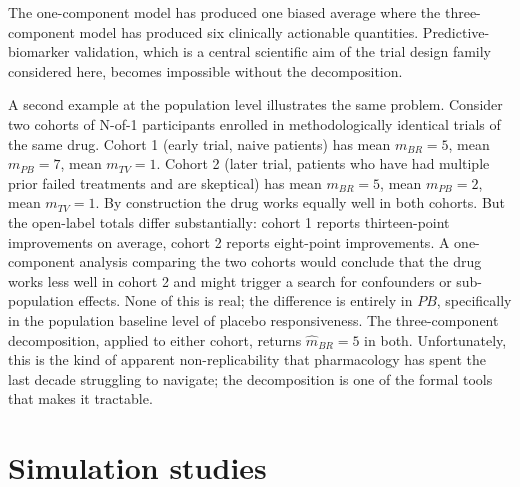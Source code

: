 \documentclass[
  11pt,
]{article}
\begin{document}
The one-component model has produced one biased average where the
three-component model has produced six clinically actionable quantities.
Predictive-biomarker validation, which is a central scientific aim of the
trial design family considered here, becomes impossible without the
decomposition.

A second example at the population level illustrates the same problem.
Consider two cohorts of N-of-1 participants enrolled in methodologically
identical trials of the same drug. Cohort 1 (early trial, naive patients) has
mean \(m_{BR} = 5\), mean \(m_{PB} = 7\), mean \(m_{TV} = 1\). Cohort 2 (later
trial, patients who have had multiple prior failed treatments and are
skeptical) has mean \(m_{BR} = 5\), mean \(m_{PB} = 2\), mean \(m_{TV} = 1\). By
construction the drug works equally well in both cohorts. But the open-label
totals differ substantially: cohort 1 reports thirteen-point improvements on
average, cohort 2 reports eight-point improvements. A one-component analysis
comparing the two cohorts would conclude that the drug works less well in
cohort 2 and might trigger a search for confounders or sub-population effects.
None of this is real; the difference is entirely in \(PB\), specifically in the
population baseline level of placebo responsiveness. The three-component
decomposition, applied to either cohort, returns \(\hat{m}_{BR} = 5\) in both.
Unfortunately, this is the kind of apparent non-replicability that
pharmacology has spent the last decade struggling to navigate; the
decomposition is one of the formal tools that makes it tractable.

\section{Simulation studies}\label{simulation-studies}
\end{document}
